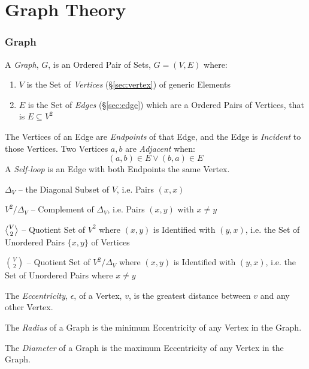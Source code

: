 \part{Graph Theory}\label{part:graph_theory}

\section{Graph}\label{sec:graph}

A \emph{Graph}, $G$, is an Ordered Pair of Sets, $G = (V,E)$ where:
\begin{enumerate}
  \item $V$ is the Set of \emph{Vertices} (\S\ref{sec:vertex}) of
    generic Elements
  \item $E$ is the Set of \emph{Edges} (\S\ref{sec:edge}) which are a
    Ordered Pairs of Vertices, that is $E \subseteq V^2$
\end{enumerate}
The Vertices of an Edge are \emph{Endpoints} of that Edge, and the
Edge is \emph{Incident} to those Vertices. Two Vertices $a,b$ are
\emph{Adjacent} when:
\[
    (a,b) \in E \vee (b,a) \in E
\]
A \emph{Self-loop} is an Edge with both Endpoints the same Vertex.

$\Delta_V$ -- the Diagonal Subset of $V$, i.e. Pairs $(x,x)$

$V^2/\Delta_V$ -- Complement of $\Delta_V$, i.e. Pairs
$(x,y)$ with $x \neq y$

$\angleover{V}{2}$ -- Quotient Set of $V^2$ where $(x,y)$ is
Identified with $(y,x)$, i.e. the Set of Unordered Pairs $\{x,y\}$ of
Vertices

${V}\choose{2}$ -- Quotient Set of $V^2/\Delta_V$ where $(x,y)$ is
Identified with $(y,x)$, i.e. the Set of Unordered Pairs where $x \neq
y$

The \emph{Eccentricity}, $\epsilon$, of a Vertex, $v$, is the greatest
distance between $v$ and any other Vertex.

The \emph{Radius} of a Graph is the minimum Eccentricity of any
Vertex in the Graph.

The \emph{Diameter} of a Graph is the maximum Eccentricity of any
Vertex in the Graph.



